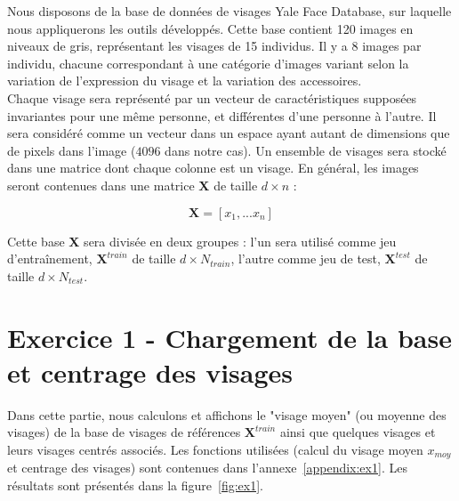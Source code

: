 \documentclass[a4paper]{article}
\newcommand{\figref}[1]{figure~\ref{#1}}
\newcommand{\annexeref}[1]{annexe~\ref{#1}}
\begin{document}
Nous disposons de la base de données de visages Yale Face Database, sur laquelle
nous appliquerons les outils développés. Cette base contient 120 images en
niveaux de gris, représentant les visages de 15 individus. Il y a 8 images par
individu, chacune correspondant à une catégorie d’images variant selon la
variation de l'expression du visage et la variation des accessoires. \\

Chaque visage sera représenté par un vecteur de caractéristiques supposées
invariantes pour une même personne, et différentes d'une personne à l'autre. Il
sera considéré comme un vecteur dans un espace ayant autant de dimensions que de
pixels dans l'image ($4096$ dans notre cas). Un ensemble de visages sera stocké
dans une matrice dont chaque colonne est un visage. En général, les images
seront contenues dans une matrice \textbf{X} de taille $d \times n$ : 

$$ \mathbf{X} = [x_1,...x_n] $$

Cette base \textbf{X} sera divisée en deux groupes : l'un sera utilisé comme jeu
d'entraînement, $\mathbf{X}^{train}$ de taille $d \times N_{train}$, l'autre
comme jeu de test, $\mathbf{X}^{test}$ de taille $d \times N_{test}$.\\

\newpage
\section*{Exercice 1 - Chargement de la base et centrage des visages}

Dans cette partie, nous calculons et affichons le "visage moyen" (ou moyenne des
visages) de la base de visages de références $\mathbf{X}^{train}$ ainsi que
quelques visages et leurs visages centrés associés. Les fonctions utilisées
(calcul du visage moyen $x_{moy}$ et centrage des visages) sont
contenues dans l'\annexeref{appendix:ex1}. Les résultats sont présentés
dans la \figref{fig:ex1}.
\end{document}
